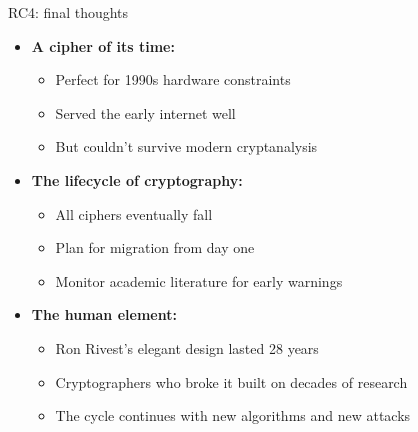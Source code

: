 \documentclass[aspectratio=169, lualatex, handout]{beamer}
\begin{document}
\begin{frame}{RC4: final thoughts}
	\begin{itemize}[<+->]
		\item \textbf{A cipher of its time:}
		      \begin{itemize}[<+->]
			      \item Perfect for 1990s hardware constraints
			      \item Served the early internet well
			      \item But couldn't survive modern cryptanalysis
		      \end{itemize}
		\item \textbf{The lifecycle of cryptography:}
		      \begin{itemize}[<+->]
			      \item All ciphers eventually fall
			      \item Plan for migration from day one
			      \item Monitor academic literature for early warnings
		      \end{itemize}
		\item \textbf{The human element:}
		      \begin{itemize}[<+->]
			      \item Ron Rivest's elegant design lasted 28 years
			      \item Cryptographers who broke it built on decades of research
			      \item The cycle continues with new algorithms and new attacks
		      \end{itemize}
	\end{itemize}
\end{frame}

\begin{frame}[plain]
	\titlepage
\end{frame}
\end{document}

